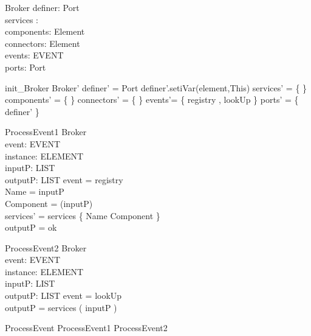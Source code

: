\begin{schema}{Broker}
definer: Port \\
services : \nat \pfun \nat \\
components: \pset Element \\
connectors: \pset Element \\
events: \pset EVENT \\
ports: \pset Port 
\end{schema}


\begin{zed}
init\_Broker \sdef \lsch Broker' \bbar definer' = \new Port \land definer'.setiVar(element,This) \land services' = \{ \} \land components' = \{ \} \land connectors' = \{ \} \land events'= \{ registry , lookUp \}  \land ports' = \{ definer' \}  \rsch  \end{zed}


\begin{schema}{ProcessEvent1}
\Delta Broker \\
event: EVENT \\
instance: ELEMENT \\
inputP: LIST \\
outputP: LIST 
\where event = registry \\
Name = \head inputP \\
Component =  \head (\tail inputP) \\
services' = services  \oplus \{ Name \map Component \} \\
outputP = ok 
\end{schema}

\begin{schema}{ProcessEvent2}
\Delta Broker \\
event: EVENT \\
instance: ELEMENT \\
inputP: LIST \\
outputP: LIST 
\where event = lookUp \\
outputP = services ( inputP ) 
\end{schema}

\begin{zed}
ProcessEvent \sdef  ProcessEvent1 \lor ProcessEvent2    \end{zed}